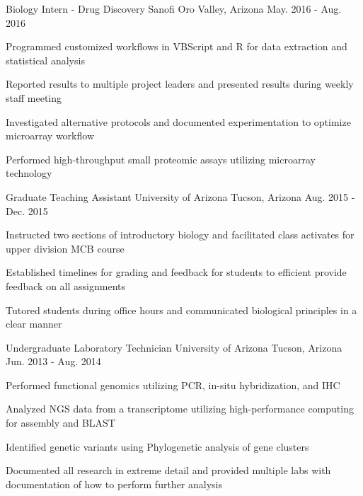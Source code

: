 \begin{cventries}
  \cventry
    {Biology Intern - Drug Discovery} %
    {Sanofi} %
    {Oro Valley, Arizona} %
    {May. 2016 - Aug. 2016} %
    {
      \begin{cvitems} %
        \item{Programmed customized workflows in VBScript and R for data extraction and statistical analysis}
        \item{Reported results to multiple project leaders and presented results during weekly staff meeting}
        \item{Investigated alternative protocols and documented experimentation to optimize microarray workflow}
        \item{Performed high-throughput small proteomic assays utilizing  microarray technology}
      \end{cvitems}
    }

  \cventry
    {Graduate Teaching Assistant} %
    {University of Arizona} %
    {Tucson, Arizona} %
    {Aug. 2015 - Dec. 2015} %
    {
      \begin{cvitems} %
        \item{Instructed two sections of introductory biology and facilitated class activates for upper division MCB course}
        \item{Established timelines for grading and feedback for students to efficient provide feedback on all assignments}
        \item{Tutored students during office hours and communicated biological principles in a clear manner}
      \end{cvitems}
    }

  \cventry
    {Undergraduate Laboratory Technician} %
    {University of Arizona} %
    {Tucson, Arizona} %
    {Jun. 2013 - Aug. 2014} %
    {
      \begin{cvitems} %
        \item{Performed functional genomics utilizing PCR, in-situ hybridization, and IHC}
        \item{Analyzed NGS data from a transcriptome utilizing high-performance computing for assembly and BLAST}
        \item{Identified genetic variants using Phylogenetic analysis of gene clusters}
        \item{Documented all research in extreme detail and provided multiple labs with documentation of how to perform further analysis}
      \end{cvitems}
    }
\end{cventries}
